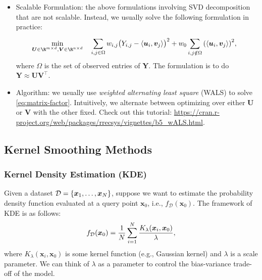 \begin{itemize}
        \item Scalable Formulation: the above formulations involving SVD decomposition that are not scalable.
        Instead, we usually solve the following formulation in practice:
            \begin{equation}\label{eq:matrix-factor}
                \begin{aligned}
                            & \min_{\bm{U} \in \R^{m \times d}, \bm{V} \in \R^{n \times d}} & & \sum_{i, j\in \Omega}^{}{ w_{i,j} \big(Y_{i,j} - \langle \bm{u}_i, \bm{v}_j \rangle \big)^2 +  w_0 \sum_{i,j \notin \Omega }^{}{ \left( \langle \bm{u}_i, \bm{v}_j \rangle \right)^2} },
                \end{aligned}
            \end{equation}
        where $\Omega$ is the set of observed entries of $\bm{Y}$.
        The formulation is to do $\bm{Y} \approx \bm{U} \bm{V}^\top$.
        \item Algorithm: we usually use \emph{weighted alternating least square} (WALS) to solve \eqref{eq:matrix-factor}.
        Intuitively, we alternate between optimizing over either $\bm{U}$ or $\bm{V}$ with the other fixed.
        Check out this tutorial: \url{https://cran.r-project.org/web/packages/rrecsys/vignettes/b5_wALS.html}.
    \end{itemize}
    
    
    
\subsection{Kernel Smoothing Methods}
    \subsubsection{Kernel Density Estimation (KDE)}
        Given a dataset $\mathcal{D}=\{ \bm{x}_1, \ldots, \bm{x}_N \}$, suppose we want to estimate the probability density function  evaluated at a query point $\bm{x}_0$, i.e., $f_\mathcal{D}(\bm{x}_0)$.
        The framework of KDE is as follows:
            \begin{equation}
                f_\mathcal{D}(\bm{x}_0) = \frac{1}{N}\sum_{i=1}^{N}{  \frac{K_\lambda(\bm{x}_i, \bm{x}_0)}{\lambda}   },
            \end{equation}
        where $K_\lambda(\bm{x}_i, \bm{x}_0)$ is some kernel function (e.g., Gaussian kernel) and $\lambda$ is a scale parameter.
        We can think of $\lambda$ as a parameter to control the bias-variance trade-off of the model.
        
